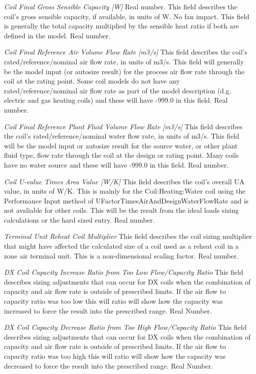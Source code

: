 \emph{Coil Final Gross Sensible Capacity [W]} Real number. This field describes the coil's gross sensible capacity, if available, in units of W. No fan impact.  This field is generally the total capacity multiplied by the sensible heat ratio if both are defined in the model. Real number.

\emph{Coil Final Reference Air Volume Flow Rate [m3/s]}  This field describes the coil's rated/reference/nominal air flow rate, in units of m3/s.  This field will generally be the model input (or autosize result) for the process air flow rate through the coil at the rating point.  Some coil models do not have any rated/reference/nominal air flow rate as part of the model description (d.g. electric and gas heating coils) and these will have -999.0 in this field. Real number. 

\emph{Coil Final Reference Plant Fluid Volume Flow Rate [m3/s]}  This field describes the coil's rated/reference/nominal water flow rate, in units of m3/s.  This field will be the model input or autosize result for the source water, or other plant fluid type, flow rate through the coil at the design or rating point.  Many coils have no water source and these will have -999.0 in this field.  Real number.

\emph{Coil U-value Times Area Value [W/K]} This field describes the coil's overall UA value, in units of W/K.  This is mainly for the Coil:Heating:Water coil using the Performance Input method of UFactorTimesAirAndDesignWaterFlowRate and is not avaliable for other coils.  This will be the result from the ideal loads sizing calculations or the hard sized entry.  Real number.

\emph{Terminal Unit Reheat Coil Multiplier}  This field describes the coil sizing multiplier that might have affected the calculated size of a coil used as a reheat coil in a zone air terminal unit.  This is a non-dimensional scaling factor.  Real number.

\emph{DX Coil Capacity Increase Ratio from Too Low Flow/Capacity Ratio}  This field describes sizing adjustments that can occur for DX coils when the combination of capacity and air flow rate is outside of prescribed limits.  If the air flow to capacity ratio was too low this will ratio will show how the capacity was increased to force the result into the prescribed range.  Real Number.

\emph{DX Coil Capacity Decrease Ratio from Too High Flow/Capacity Ratio}  This field describes sizing adjustments that can occur for DX coils when the combination of capacity and air flow rate is outside of prescribed limits.  If the air flow to capacity ratio was too high this will ratio will show how the capacity was decreased to force the result into the prescribed range.  Real Number.


